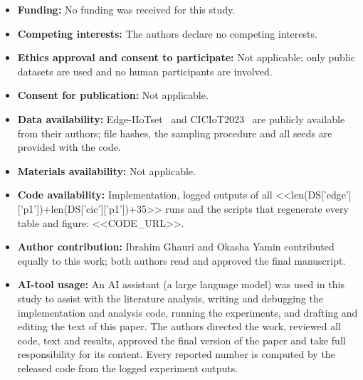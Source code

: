 \documentclass[pdflatex,sn-mathphys-num,iicol]{sn-jnl}
\begin{document}
\begin{itemize}
\item \textbf{Funding:} No funding was received for this study.
\item \textbf{Competing interests:} The authors declare no competing interests.
\item \textbf{Ethics approval and consent to participate:} Not applicable; only public datasets are used and no human participants are involved.
\item \textbf{Consent for publication:} Not applicable.
\item \textbf{Data availability:} Edge-IIoTset~\cite{ferrag2022} and CICIoT2023~\cite{neto2023} are publicly available from their authors; file hashes, the sampling procedure and all seeds are provided with the code.
\item \textbf{Materials availability:} Not applicable.
\item \textbf{Code availability:} Implementation, logged outputs of all <<len(DS['edge']['p1'])+len(DS['cic']['p1'])+35>> runs and the scripts that regenerate every table and figure: <<CODE_URL>>.
\item \textbf{Author contribution:} Ibrahim Ghauri and Okasha Yamin contributed equally to this work; both authors read and approved the final manuscript.
\item \textbf{AI-tool usage:} An AI assistant (a large language model) was used in this study to assist with the literature analysis, writing and debugging the implementation and analysis code, running the experiments, and drafting and editing the text of this paper. The authors directed the work, reviewed all code, text and results, approved the final version of the paper and take full responsibility for its content. Every reported number is computed by the released code from the logged experiment outputs.
\end{itemize}


\end{document}
